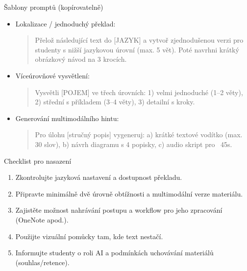 Šablony promptů (kopírovatelně)
\begin{itemize}
  \item Lokalizace / jednoduchý překlad:
    \begin{quote}
      
\begin{PromptBlock}

Přelož následující text do [JAZYK] a vytvoř zjednodušenou verzi pro studenty s nižší jazykovou úrovní (max. 5 vět). Poté navrhni krátký obrázkový návod na 3 krocích.
\end{PromptBlock}

    \end{quote}
  \item Víceúrovňové vysvětlení:
    \begin{quote}
      
\begin{PromptBlock}

Vysvětli [POJEM] ve třech úrovních: 1) velmi jednoduché (1–2 věty), 2) střední s příkladem (3–4 věty), 3) detailní s kroky.
\end{PromptBlock}

    \end{quote}
  \item Generování multimodálního hintu:
    \begin{quote}
      
\begin{PromptBlock}

Pro úlohu [stručný popis] vygeneruj: a) krátké textové vodítko (max. 30 slov), b) návrh diagramu s 4 popisky, c) audio skript pro ~45s.
\end{PromptBlock}

    \end{quote}
\end{itemize}

Checklist pro nasazení
\begin{enumerate}
  \item Zkontrolujte jazyková nastavení a dostupnost překladu.
  \item Připravte minimálně dvě úrovně obtížnosti a multimodální verze materiálu.
  \item Zajistěte možnost nahrávání postupu a workflow pro jeho zpracování (OneNote apod.).
  \item Použijte vizuální pomůcky tam, kde text nestačí.
  \item Informujte studenty o roli AI a podmínkách uchovávání materiálů (souhlas/retence).
\end{enumerate}

